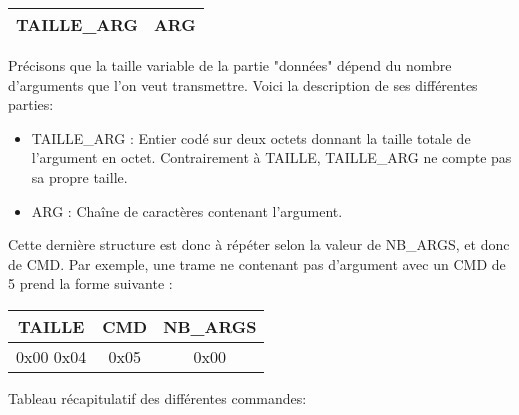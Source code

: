         \begin{center}

            \begin{tabular}{|c|c|}
                \hline
                TAILLE\_ARG & ARG \\
                \hline
            \end{tabular}
        \end{center}

        Précisons que la taille variable de la partie "données" dépend du nombre d'arguments que l'on veut transmettre.
        Voici la description de ses différentes parties:

        \begin{itemize}
            \item {TAILLE\_ARG : Entier codé sur deux octets donnant la taille totale de l'argument en octet.
            Contrairement à TAILLE, TAILLE\_ARG ne compte pas sa propre taille.}
            \item {ARG : Chaîne de caractères contenant l'argument.}
        \end{itemize} 
        
        Cette dernière structure est donc à répéter selon la valeur de NB\_ARGS, et donc de CMD.
        Par exemple, une trame ne contenant pas d'argument avec un CMD de 5 prend la forme suivante : 

        \begin {table}[H]
        \center
        \begin{tabular}{|c|c|c|}
            \hline
            \textbf{TAILLE} & \textbf{CMD} & \textbf{NB\_ARGS} \\
            \hline
            0x00 0x04 & 0x05 & 0x00 \\
            \hline
        \end{tabular}
        \end{table}

\newpage

        Tableau récapitulatif des différentes commandes: 

